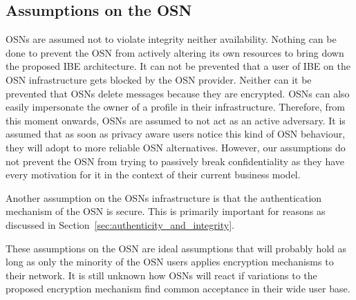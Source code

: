 \subsection{Assumptions on the OSN}
OSNs are assumed not to violate integrity neither availability. Nothing can be done to prevent the OSN from actively altering its own resources to bring down the proposed IBE architecture. It can not be prevented that a user of IBE on the OSN infrastructure gets blocked by the OSN provider. Neither can it be prevented that OSNs delete messages because they are encrypted. OSNs can also easily impersonate the owner of a profile in their infrastructure. Therefore, from this moment onwards, OSNs are assumed to not act as an active adversary. It is assumed that as soon as privacy aware users notice this kind of OSN behaviour, they will adopt to more reliable OSN alternatives. However, our assumptions do not prevent the OSN from trying to passively break confidentiality as they have every motivation for it in the context of their current business model.

Another assumption on the OSNs infrastructure is that the authentication mechanism of the OSN is secure. This is primarily important for reasons as discussed in Section~\ref{sec:authenticity_and_integrity}.

These assumptions on the OSN are ideal assumptions that will probably hold as long as only the minority of the OSN users applies encryption mechanisms to their network. It is still unknown how OSNs will react if variations to the proposed encryption mechanism find common acceptance in their wide user base.





